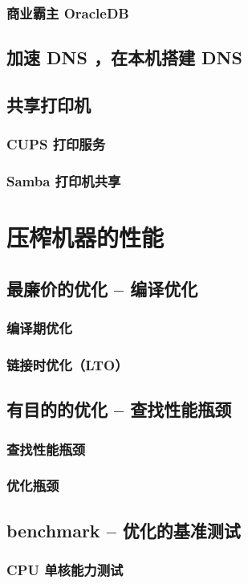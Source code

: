\documentclass[amstex,twoside]{ctexbook}
\begin{document}
\subsection{  商业霸主 OracleDB	}
\section{  加速 DNS ，在本机搭建 DNS	}
\section{  共享打印机	}
\subsection{ CUPS 打印服务	}
\subsection{ Samba 打印机共享	}


\chapter{压榨机器的性能}
\section{  最廉价的优化 – 编译优化	}
\subsection{  编译期优化	}
\subsection{  链接时优化（LTO）	}
\section{  有目的的优化 – 查找性能瓶颈}
\subsection{ 查找性能瓶颈}
\subsection{  优化瓶颈}
\section{  benchmark – 优化的基准测试}
\subsection{  CPU 单核能力测试}
\end{document}
